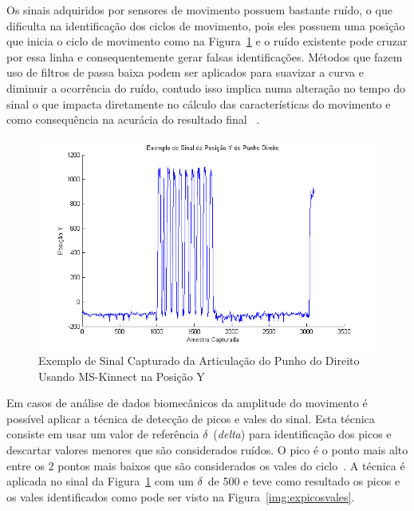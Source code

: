 Os sinais adquiridos por sensores de movimento possuem bastante ruído, o que dificulta na identificação dos ciclos de movimento, pois eles possuem uma posição que inicia o ciclo de movimento como na Figura~\ref{img:exsinalposicaopunho} e o ruído existente pode cruzar por essa linha e consequentemente gerar falsas identificações. Métodos que fazem uso de filtros de passa baixa podem ser aplicados para suavizar a curva e diminuir a ocorrência do ruído, contudo isso implica numa alteração no tempo do sinal o que impacta diretamente no cálculo das características do movimento e como consequência na acurácia do resultado final ~\cite{peakdetect}.

\begin{figure}[!htb]
     \centering
     \includegraphics[width=1\textwidth]{./img/exsinalposicaoypunhodireito.png}
     \caption{Exemplo de Sinal Capturado da Articulação do Punho do Direito Usando MS-Kinnect na Posição Y}
     \label{img:exsinalposicaopunho}
\end{figure}

Em casos de análise de dados biomecânicos da amplitude do movimento é possível aplicar a técnica de detecção de picos e vales do sinal. Esta técnica consiste em usar um valor de referência $\delta$\ (\textit{delta}) para identificação dos picos e descartar valores menores que são considerados ruídos. O pico é o ponto mais alto entre os 2 pontos mais baixos que são considerados os vales do ciclo~\cite{peakdetect}. A técnica é aplicada no sinal da Figura~\ref{img:exsinalposicaopunho} com um $\delta$\ de 500 e teve como resultado os picos e os vales identificados como pode ser visto na Figura~\ref{img:expicosvales}.

